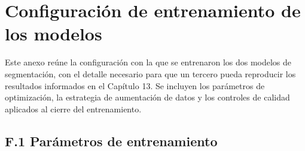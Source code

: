 \chapter{Configuración de entrenamiento de los modelos}
\label{anexo:configuracion-entrenamiento}

Este anexo reúne la configuración con la que se entrenaron los dos modelos de segmentación, con el detalle necesario para que un tercero pueda reproducir los resultados informados en el Capítulo 13. Se incluyen los parámetros de optimización, la estrategia de aumentación de datos y los controles de calidad aplicados al cierre del entrenamiento. %

\section*{F.1 Parámetros de entrenamiento}
\label{anexo:entrenamiento-f1-parametros}

